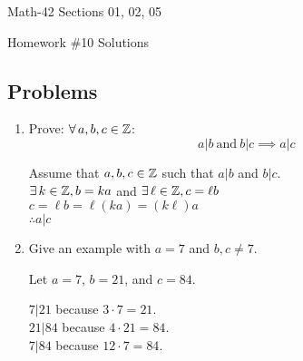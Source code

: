 \documentclass[letterpaper,12pt,fleqn]{article}
\begin{document}
\begin{center}
  \large
  Math-42 Sections 01, 02, 05

  \Large
  Homework \#10 Solutions
\end{center}

\subsection*{Problems}

\begin{enumerate}
\item Prove: \(\forall\,a,b,c\in\mathbb{Z}\):
  \[a|b\ \text{and}\ b|c\implies a|c\]

  Assume that \(a,b,c\in\mathbb{Z}\) such that \(a|b\) and \(b|c\). \\
  \(\exists\,k\in\mathbb{Z},b=ka\) and \(\exists\,\ell\in\mathbb{Z},c=\ell b\) \\
  \(c=\ell b=\ell(ka)=(k\ell)a\) \\
  \(\therefore a|c\)

  \bigskip
  
\item Give an example with \(a=7\) and \(b,c\ne7\).

  Let \(a=7\), \(b=21\), and \(c=84\).
  
  \(7|21\) because \(3\cdot7=21\). \\
  \(21|84\) because \(4\cdot21=84\). \\
  \(7|84\) because \(12\cdot7=84\).
\end{enumerate}
\end{document}
